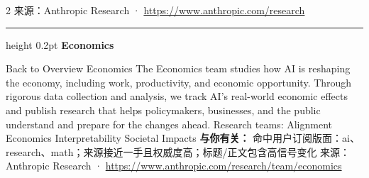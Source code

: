\documentclass[10.5pt]{ctexart}
\begin{document}
\begin{multicols}{2}
{\footnotesize\color{ormuted} 来源：Anthropic Research · \url{https://www.anthropic.com/research}}
\vspace{2mm}
\hrule height 0.2pt
\vspace{2mm}
{\large\bfseries Economics}\par
Back to Overview Economics The Economics team studies how AI is reshaping the economy, including work, productivity, and economic opportunity. Through rigorous data collection and analysis, we track AI's real-world economic effects and publish research that helps policymakers, businesses, and the public understand and prepare for the changes ahead. Research teams: Alignment Economics Interpretability Societal Impacts
\textbf{与你有关：} 命中用户订阅版面：ai、research、math；来源接近一手且权威度高；标题/正文包含高信号变化
{\footnotesize\color{ormuted} 来源：Anthropic Research · \url{https://www.anthropic.com/research/team/economics}}
\end{multicols}
\end{document}

